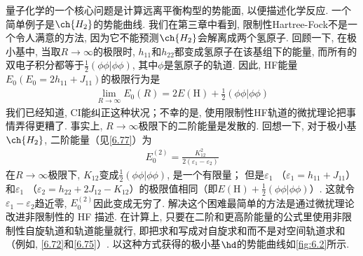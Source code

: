 量子化学的一个核心问题是计算远离平衡构型的势能面, 以便描述化学反应. 一个简单例子是$\ch{H_2}$的势能曲线. 
我们在第三章中看到, 限制性Hartree-Fock不是一个令人满意的方法, 因为它不能预测$\ch{H_2}$会解离成两个氢原子. 
回顾一下, 在极小基中, 当取$R\to\infty$的极限时, $h_{11}$和$h_{22}$都变成氢原子在该基组下的能量, 
而所有的双电子积分都等于$\frac{1}{2}(\phi\phi|\phi\phi)$, 其中$\phi$是氢原子的轨道. 
因此, HF能量$E_0(E_0=2h_{11}+J_{11})$的极限行为是
\begin{align}
	\lim_{R\to\infty} E_0(R) = 2E(\mathrm{H}) + \frac{1}{2}(\phi\phi|\phi\phi)
\end{align}
我们已经知道, CI能纠正这种状况；不幸的是, 使用限制性HF轨道的微扰理论把事情弄得更糟了. 
事实上, $R\to\infty$极限下的二阶能量是发散的.  回想一下, 对于极小基$\ch{H_2}$, 二阶能量（见\autoref{6.77}）为
\begin{align*}
	E_0^{(2)}  = \frac{K_{12}^2}{2(\varepsilon_1 - \varepsilon_2)}
\end{align*}
在$R\to\infty$极限下, $K_{12}$变成$\frac{1}{2}(\phi\phi|\phi\phi)$, 是一个有限量；
但是$\varepsilon_1$ （$\varepsilon_1=h_{11}+J_{11}$）和$\varepsilon_1$ （$\varepsilon_2=h_{22}+2J_{12}-K_{12}$）的极限值相同（即$E(\mathrm{H})+\frac{1}{2}(\phi\phi|\phi\phi)$）. 
这就令$\varepsilon_1-\varepsilon_2$趋近零, $E_0^{(2)}$因此变成无穷了. 
解决这个困难最简单的方法是通过微扰理论改进非限制性的 HF 描述.  
在计算上, 只要在二阶和更高阶能量的公式里使用非限制性自旋轨道和轨道能量就行, 
即把求和写成对自旋求和而不是对空间轨道求和（例如, \autoref{6.72}和\autoref{6.75}）.  
以这种方式获得的极小基$\hd$的势能曲线如\autoref{fig:6.2}所示. 

